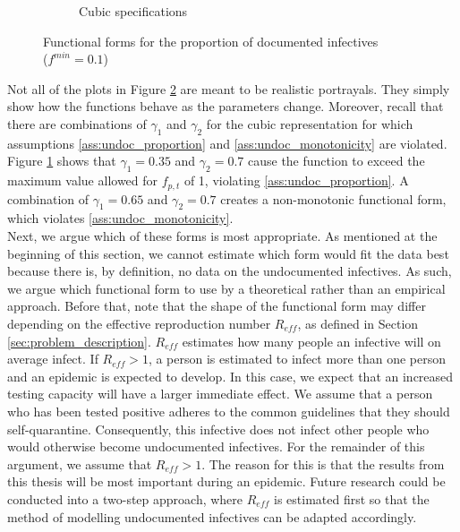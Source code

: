 \documentclass[12pt]{article}
\begin{document}
\begin{figure}[ht]
{\begin{subfigure}[pt]{0.48\linewidth}
	    \caption{Cubic specifications}
	    \label{fig:functional_forms_cubic}
	\end{subfigure}
    }
    
    \caption{Functional forms for the proportion of documented infectives \\($f^{min} = 0.1$)}
    \label{fig:functional_forms}
    \end{figure}
    
    Not all of the plots in Figure \ref{fig:functional_forms} are meant to be realistic portrayals. They simply show how the functions behave as the parameters change. Moreover, recall that there are combinations of $\gamma_1$ and $\gamma_2$ for the cubic representation for which assumptions \ref{ass:undoc_proportion} and \ref{ass:undoc_monotonicity} are violated. Figure \ref{fig:functional_forms_cubic} shows that $\gamma_1=0.35$ and $\gamma_2=0.7$ cause the function to exceed the maximum value allowed for $f_{p,t}$ of 1, violating \ref{ass:undoc_proportion}. A combination of $\gamma_1=0.65$ and $\gamma_2=0.7$ creates a non-monotonic functional form, which violates \ref{ass:undoc_monotonicity}. \\
    
    Next, we argue which of these forms is most appropriate. As mentioned at the beginning of this section, we cannot estimate which form would fit the data best because there is, by definition, no data on the undocumented infectives. As such, we argue which functional form to use by a theoretical rather than an empirical approach. Before that, note that the shape of the functional form may differ depending on the effective reproduction number $R_{eff}$, as defined in Section \ref{sec:problem_description}. $R_{eff}$ estimates how many people an infective will on average infect. If $R_{eff} > 1$, a person is estimated to infect more than one person and an epidemic is expected to develop. In this case, we expect that an increased testing capacity will have a larger immediate effect. We assume that a person who has been tested positive adheres to the common guidelines that they should self-quarantine. Consequently, this infective does not infect other people who would otherwise become undocumented infectives. For the remainder of this argument, we assume that $R_{eff} > 1$. The reason for this is that the results from this thesis will be most important during an epidemic. Future research could be conducted into a two-step approach, where $R_{eff}$ is estimated first so that the method of modelling undocumented infectives can be adapted accordingly. \\
    
\end{document}
